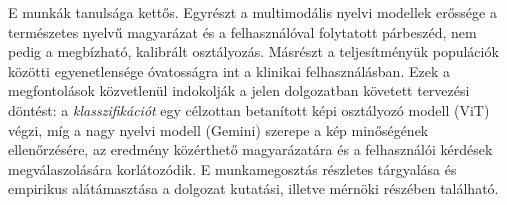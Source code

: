 E munkák tanulsága kettős. Egyrészt a multimodális nyelvi modellek erőssége a
természetes nyelvű magyarázat és a felhasználóval folytatott párbeszéd, nem pedig
a megbízható, kalibrált osztályozás. Másrészt a teljesítményük populációk közötti
egyenetlensége óvatosságra int a klinikai felhasználásban. Ezek a megfontolások
közvetlenül indokolják a jelen dolgozatban követett tervezési döntést: a
\textit{klasszifikációt} egy célzottan betanított képi osztályozó modell (ViT)
végzi, míg a nagy nyelvi modell (Gemini) szerepe a kép minőségének ellenőrzésére,
az eredmény közérthető magyarázatára és a felhasználói kérdések megválaszolására
korlátozódik. E munkamegosztás részletes tárgyalása és empirikus alátámasztása a
dolgozat kutatási, illetve mérnöki részében található.

